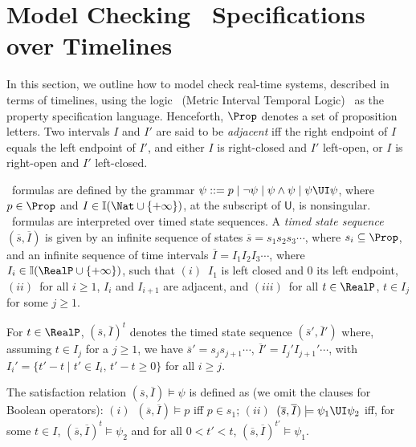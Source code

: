 \section{Model Checking \MITL\ Specifications over Timelines} \label{sec:modelchecking}

In this section, we outline how to model check real-time systems, described in terms of timelines,
using the logic \MITL\ (Metric Interval Temporal Logic)~\cite{Alur:1996} as the property specification language.
%
Henceforth, $\Prop$ denotes a set of proposition letters.
Two intervals $I$ and $I'$ are said to be \emph{adjacent} iff the right endpoint of $I$ equals the left endpoint of $I'$,
and either $I$ is right-closed and $I'$ left-open, or $I$ is right-open and $I'$ left-closed.

\MITL\ formulas are
defined by the grammar $\psi ::= p\mid \neg \psi \mid \psi \wedge \psi\mid \psi \UI \psi $,
where $p\in\Prop$ and $I\in \mathbb{I}(\Nat\cup\{+\infty\})$, at the subscript of $\mathsf{U}$, is nonsingular.
%
\MITL\ formulas are interpreted over timed state sequences.
A \emph{timed state sequence} $(\overline{s},\overline{I})$ is given by an infinite sequence of states $\overline{s}=s_1s_2s_3\cdots$, where $s_i\subseteq \Prop$, and an infinite
sequence of time intervals $\overline{I}=I_1 I_2 I_3\cdots$, where $I_i \in \mathbb{I}(\RealP\cup\{+\infty\})$,
such that $(i)$~$I_1$ is left closed and 0 its left endpoint, $(ii)$~for all $i\geq 1$, $I_i$ and $I_{i+1}$ are adjacent, and $(iii)$~for all $t\in\RealP$, $t \in I_j$ for some $j\geq 1$.

For $t\in\RealP$, $(\overline{s},\overline{I})^t$ denotes the timed state sequence $(\overline{s}',\overline{I}')$ where,
assuming $t \in I_j$ for a $j\geq 1$, we have
$\overline{s}'\!=\!s_j s_{j+1}\cdots$, $\overline{I}'\!=\!I_j' I_{j+1}'\cdots $, with $I_i'\!=\!\{t'\!-\! t \!\mid\!  t'\in I_i ,\, t'-t\geq 0\}$ for all $i\geq j$.

The satisfaction relation $(\overline{s},\overline{I})\models \psi$ is defined as (we omit the clauses for Boolean operators):
$(i)$~$(\overline{s},\overline{I})\models p$ iff $p\in s_1$;
$(ii)$~$(\overline{s},\overline{I})\models \psi_1 \UI \psi_2$ iff, for some $t\in I$, $(\overline{s},\overline{I})^t\models \psi_2$ and for all $0<t'< t$, $(\overline{s},\overline{I})^{t'}\models \psi_1$.

